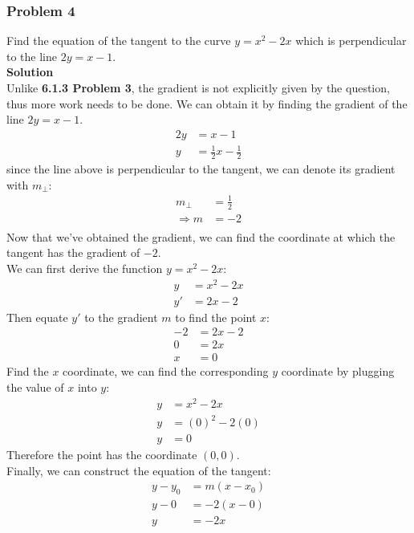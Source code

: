 \documentclass[hidelinks, a4paper, 12pt]{article}
\newcommand{\bd}{\textbf}
\newcommand{\n}{\\[\baselineskip]}
\begin{document}
            \subsubsection{Problem 4}
                Find the equation of the tangent to the curve $y = x^2 -2x$ which is perpendicular to the line $2y = x -1$.\n
                \bd{Solution}\n
                Unlike \bd{6.1.3 Problem 3}, the gradient is not explicitly given by the question, thus more work needs to be done.
                We can obtain it by finding the gradient of the line $2y = x - 1$.
                \[\begin{split}
                    2y &= x - 1\\
                    y &= \frac{1}{2}x - \frac{1}{2}
                \end{split}\]
                since the line above is perpendicular to the tangent, we can denote its gradient with $m_\perp$:
                \[\begin{split}
                    m_\perp &= \frac{1}{2}\\
                    \Rightarrow m &= -2\\
                \end{split}\]
                Now that we've obtained the gradient, we can find the coordinate at which the tangent has the gradient of $-2$.\n
                We can first derive the function $y = x^2 - 2x$:
                \[\begin{split}
                    y &= x^2 - 2x\\
                    y' &= 2x - 2
                \end{split}\]
                Then equate $y'$ to the gradient $m$ to find the point $x$:
                \[\begin{split}
                    -2 &= 2x - 2\\
                    0 &= 2x\\
                    x &= 0
                \end{split}\]
                Find the $x$ coordinate, we can find the corresponding $y$ coordinate by plugging the value of $x$ into $y$:
                \[\begin{split}
                    y &= x^2 - 2x\\
                    y &= (0)^2 - 2(0)\\
                    y &= 0
                \end{split}\]
                Therefore the point has the coordinate $(0, 0)$.\n
                Finally, we can construct the equation of the tangent:
                \[\begin{split}
                    y - y_0 &= m (x-x_0)\\
                    y - 0 &= -2(x-0)\\
                    y &= -2x
                \end{split}\]
\end{document}
